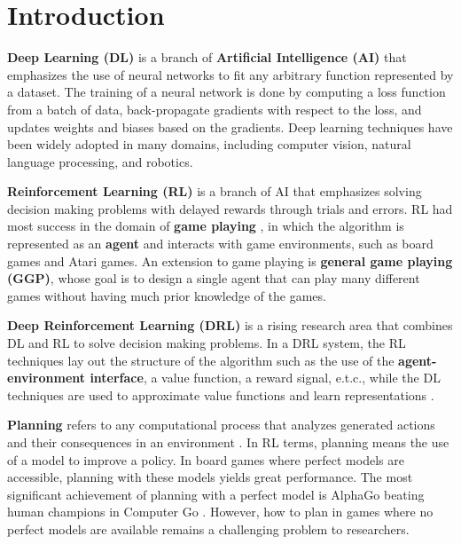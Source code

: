 \chapter{Introduction} \label{sec:intro}

\textbf{Deep Learning (DL)} is a branch of \textbf{Artificial Intelligence (AI)} that emphasizes the use of neural networks to fit any arbitrary function represented by a dataset.
The training of a neural network is done by computing a loss function from a batch of data, back-propagate gradients with respect to the loss, and updates weights and biases based on the gradients.
Deep learning techniques have been widely adopted in many domains, including computer vision, natural language processing, and robotics.

\textbf{Reinforcement Learning (RL)} is a branch of AI that emphasizes solving decision making problems with delayed rewards through trials and errors.
RL had most success in the domain of \textbf{game playing} \cite{MasteringGameGo_Silver.Schrittwieser.ea_2017}, in which the algorithm is represented as an \textbf{agent} and interacts with game environments, such as board games and Atari games.
An extension to game playing is \textbf{general game playing (GGP)}, whose goal is to design a single agent that can play many different games without having much prior knowledge of the games.

\textbf{Deep Reinforcement Learning (DRL)} is a rising research area that combines DL and RL to solve decision making problems.
In a DRL system, the RL techniques lay out the structure of the algorithm such as the use of the \textbf{agent-environment interface}, a value function, a reward signal, e.t.c., while the DL techniques are used to approximate value functions and learn representations \cite{ReinforcementLearningIntroduction_Sutton.Barto_2018}.

\textbf{Planning} refers to any computational process that analyzes generated actions and their consequences in an environment \cite{ReinforcementLearningIntroduction_Sutton.Barto_2018}.
In RL terms, planning means the use of a model to improve a policy.
In board games where perfect models are accessible, planning with these models yields great performance.
The most significant achievement of planning with a perfect model is AlphaGo beating human champions in Computer Go \cite{MasteringGameGo_Silver.Schrittwieser.ea_2017}.
However, how to plan in games where no perfect models are available remains a challenging problem to researchers.


